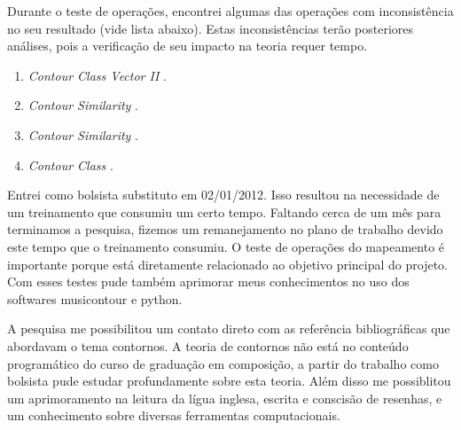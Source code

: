 \documentclass[11pt]{article}
\newcommand{\eng}[1]{\textit{#1}}
\begin{document}
Durante o teste de operações, encontrei algumas das operações com
inconsistência no seu resultado (vide lista abaixo). Estas inconsistências terão posteriores
análises, pois a verificação de seu impacto na teoria requer tempo.


\begin{enumerate}
\item \eng{Contour Class Vector II} \cite[p. 241]{Friedmann1985}.
\item \eng{Contour Similarity} \cite[p. 242]{Quinn1997}.
\item \eng{Contour Similarity} \cite[p. 262]{Quinn1997}.
\item \eng{Contour Class} \cite[p. 113]{Schultz2008}.
\end{enumerate}

Entrei como bolsista substituto em 02/01/2012. Isso resultou na
necessidade de um treinamento que consumiu um certo tempo. Faltando 
cerca de um mês para terminamos a pesquisa, fizemos um remanejamento
no plano de trabalho devido este tempo que o treinamento consumiu.
O teste de operações do mapeamento é importante porque está diretamente
relacionado ao objetivo principal do projeto. Com esses testes pude
também aprimorar meus conhecimentos no uso dos softwares musicontour
e python.

A pesquisa me possibilitou um contato direto com as referência bibliográficas que abordavam
o tema contornos.
A teoria de contornos não está no conteúdo programático do curso de graduação em composição,
a partir do trabalho como bolsista pude estudar profundamente sobre esta teoria.
Além disso me possiblitou um aprimoramento na leitura da lígua inglesa, escrita e conscisão
de resenhas, e um conhecimento sobre diversas ferramentas computacionais.
\end{document}
